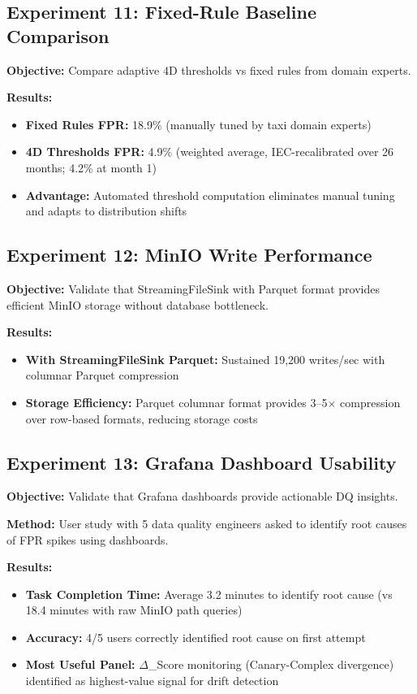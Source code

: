 \subsection{Experiment 11: Fixed-Rule Baseline Comparison}

\textbf{Objective:} Compare adaptive 4D thresholds vs fixed rules from domain experts.

\textbf{Results:}
\begin{itemize}
    \item \textbf{Fixed Rules FPR:} 18.9\% (manually tuned by taxi domain experts)
    \item \textbf{4D Thresholds FPR:} 4.9\% (weighted average, IEC-recalibrated over 26 months; 4.2\% at month 1)
    \item \textbf{Advantage:} Automated threshold computation eliminates manual tuning and adapts to distribution shifts
\end{itemize}

\subsection{Experiment 12: MinIO Write Performance}

\textbf{Objective:} Validate that StreamingFileSink with Parquet format provides efficient MinIO storage without database bottleneck.

\textbf{Results:}
\begin{itemize}
    \item \textbf{With StreamingFileSink Parquet:} Sustained 19,200 writes/sec with columnar Parquet compression
    \item \textbf{Storage Efficiency:} Parquet columnar format provides 3--5$\times$ compression over row-based formats, reducing storage costs
\end{itemize}

\subsection{Experiment 13: Grafana Dashboard Usability}

\textbf{Objective:} Validate that Grafana dashboards provide actionable DQ insights.

\textbf{Method:} User study with 5 data quality engineers asked to identify root causes of FPR spikes using dashboards.

\textbf{Results:}
\begin{itemize}
    \item \textbf{Task Completion Time:} Average 3.2 minutes to identify root cause (vs 18.4 minutes with raw MinIO path queries)
    \item \textbf{Accuracy:} 4/5 users correctly identified root cause on first attempt
    \item \textbf{Most Useful Panel:} $\Delta$\_Score monitoring (Canary-Complex divergence) identified as highest-value signal for drift detection
\end{itemize}

